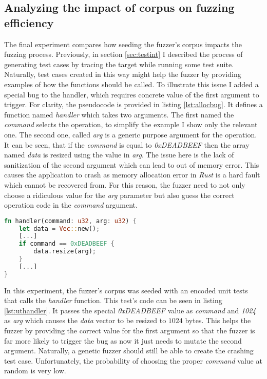 \subsection{Analyzing the impact of corpus on fuzzing efficiency}
The final experiment compares how seeding the fuzzer's corpus impacts the fuzzing process. Previously, in section \ref{sec:testint} I described the process of generating test cases by tracing the target while running some test suite. Naturally, test cases created in this way might help the fuzzer by providing examples of how the functions should be called. To illustrate this issue I added a special bug to the handler, which requires concrete value of the first argument to trigger. For clarity, the pseudocode is provided in listing \ref{lst:allocbug}. It defines a function named \textit{handler} which takes two arguments. The first named the \textit{command} selects the operation, to simplify the example I show only the relevant one. The second one, called \textit{arg} is a generic purpose argument for the operation. It can be seen, that if the \textit{command} is equal to \textit{0xDEADBEEF} then the array named \textit{data} is resized using the value in \textit{arg}. The issue here is the lack of sanitization of the second argument which can lead to out of memory error. This causes the application to crash as memory allocation error in \textit{Rust} is a hard fault which cannot be recovered from. For this reason, the fuzzer need to not only choose a ridiculous value for the \textit{arg} parameter but also guess the correct operation code in the \textit{command} argument.  

\begin{minipage}{\linewidth}
    \begin{lstlisting}[language=rust,caption={The allocation bug pseudocode.},label={lst:allocbug}]
fn handler(command: u32, arg: u32) {
    let data = Vec::new();
    [...]
    if command == 0xDEADBEEF {
        data.resize(arg);
    }
    [...]
}
    \end{lstlisting}
\end{minipage}

In this experiment, the fuzzer's corpus was seeded with an encoded unit tests that calls the \textit{handler} function. This test's code can be seen in listing \ref{lst:uthandler}. It passes the special \textit{0xDEADBEEF} value as \textit{command} and \textit{1024} as \textit{arg} which causes the \textit{data} vector to be resized to $1024$ bytes. This helps the fuzzer by providing the correct value for the first argument so that the fuzzer is far more likely to trigger the bug as now it just needs to mutate the second argument. Naturally, a genetic fuzzer should still be able to create the crashing test case. Unfortunately, the probability of choosing the proper \textit{command} value at random is very low. 

